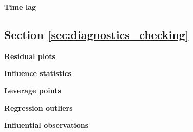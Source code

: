 \begin{exercise}
\label{ex:cross_correlation_function}  

\textbf{Time lag}



\end{exercise}

\subsection{Section \ref{sec:diagnostics_checking}}

\begin{exercise}
\label{ex:residual_plots}

\textbf{Residual plots}



\end{exercise}

\begin{exercise}
\label{ex:influence_statistics}

\textbf{Influence statistics}



\end{exercise}

\begin{exercise}
\label{ex:leverage_points}

\textbf{Leverage points}





\end{exercise}

\begin{exercise}
\label{ex:regression_outliers}

\textbf{Regression outliers}



\end{exercise}

\begin{exercise}
\label{ex:influential_observations}

\textbf{Influential observations}




\end{exercise}

